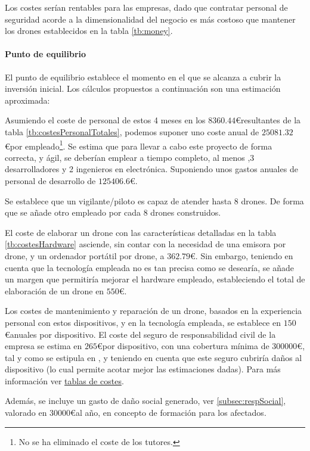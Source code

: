 Los costes serían rentables para las empresas, dado que contratar personal de seguridad acorde a la dimensionalidad del negocio es más costoso que mantener los drones establecidos en la tabla \ref{tb:money}.

\paragraph{Punto de equilibrio} El punto de equilibrio establece el momento en el que se alcanza a cubrir la inversión inicial. Los cálculos propuestos a continuación son una estimación aproximada: 

Asumiendo el coste de personal de estos 4 meses en los $8360.44$\euro resultantes de la tabla \ref{tb:costesPersonalTotales}, podemos suponer uno coste anual de $25081.32$\euro por empleado\footnote{No se ha eliminado el coste de los tutores.}. 
Se estima que para llevar a cabo este proyecto de forma correcta, y ágil, se deberían emplear a tiempo completo, al menos ,3 desarrolladores y 2 ingenieros en electrónica. Suponiendo unos gastos anuales de personal de desarrollo de $125406.6$\euro.

Se establece que un vigilante/piloto es capaz de atender hasta 8 drones. De forma que se añade otro empleado por cada 8 drones construidos.

El coste de elaborar un drone con las características detalladas en la tabla \ref{tb:costesHardware} asciende, sin contar con la necesidad de una emisora por drone, y un ordenador portátil por drone, a $362.79$\euro. Sin embargo, teniendo en cuenta que la tecnología empleada no es tan precisa como se desearía, se añade un margen que permitiría mejorar el hardware empleado, estableciendo el total de elaboración de un drone en $550$\euro. 

Los costes de mantenimiento y reparación de un drone, basados en la experiencia personal con estos dispositivos, y en la tecnología empleada, se establece en $150$\euro anuales por dispositivo. El coste del seguro de responsabilidad civil de la empresa se estima en $265$\euro por dispositivo, con una cobertura mínima de $300000$\euro, tal y como se estipula en \citep{wiki:respCivil}, y teniendo en cuenta que este seguro cubriría daños al dispositivo (lo cual permite acotar mejor las estimaciones dadas). Para más información ver \href{https://www.aenus.es/responsabilidad-civil-danos-profesional/}{tablas de costes}. 

Además, se incluye un gasto de daño social generado, ver \ref{subsec:respSocial}, valorado en $30000$\euro al año, en concepto de formación para los afectados.

